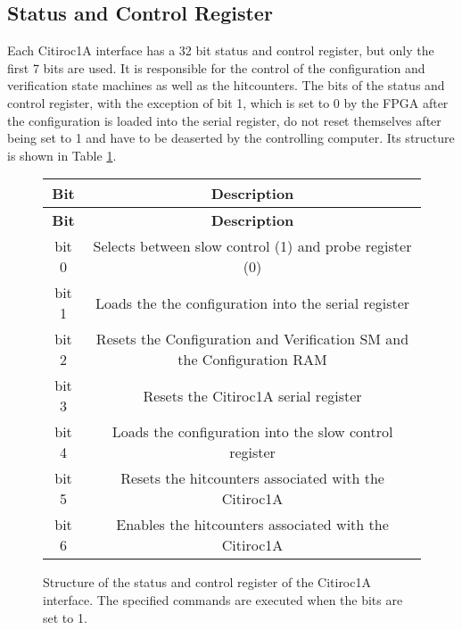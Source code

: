 \subsection{Status and Control Register}
Each Citiroc1A interface has a 32 bit status and control register, but only the first 7 bits are used.
 It is responsible for the control of the configuration and verification state machines as well as the hitcounters.
 The bits of the status and control register, with the exception of bit 1, which is set to 0 by the FPGA after the configuration is loaded into the serial register,
do not reset themselves after being set to 1 and have to be deaserted by the controlling computer.
\newline
Its structure is shown in Table \ref{tab:status_control_register}.
\begin{figure}  
    \centering
\begin{longtable}{|c|c|}
    \hline
    \textbf{Bit} & \textbf{Description} \\
    \hline
    \endfirsthead
    
    \hline
    \textbf{Bit} & \textbf{Description} \\
    \hline
    \endhead
    
    \hline
    \endfoot
    
    \hline
    \endlastfoot
    bit 0 & Selects between slow control (1) and probe register (0) \\
    bit 1 & Loads the the configuration into the serial register\\
    bit 2 & Resets the Configuration and Verification SM and the Configuration RAM \\
    bit 3 & Resets the  Citiroc1A serial register \\
    bit 4 & Loads the configuration into the slow control register \\
    bit 5 & Resets the hitcounters associated with the Citiroc1A \\
    bit 6 & Enables the hitcounters associated with the Citiroc1A \\
    \hline
    \end{longtable}
    \caption{Structure of the status and control register of the Citiroc1A interface. 
    The specified commands are executed when the bits are set to 1. }  
    \label{tab:status_control_register}
\end{figure}  
  
